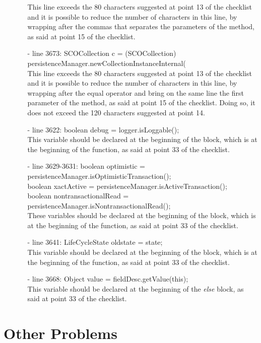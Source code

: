 \documentclass[18pt,oneside,a4paper, titlepage]{article}
\begin{document}
\begin{itemize}
\begin{itemize}
			This line exceeds the 80 characters suggested at point 13 of the checklist and it is possible to reduce the number of characters in this line, by wrapping after the commas that separates the parameters of the method, as said at point 15 of the checklist.
			\item[-] line 3673: SCOCollection c = (SCOCollection) persistenceManager.newCollectionInstanceInternal(\\
			This line exceeds the 80 characters suggested at point 13 of the checklist and it is possible to reduce the number of characters in this line, by wrapping after the equal operator and bring on the same line the first parameter of the method, as said at point 15 of the checklist. Doing so, it does not exceed the 120 characters suggested at point 14.
			\item[-] line 3622: boolean debug = logger.isLoggable();\\
			This variable should be declared at the beginning of the block, which is at the beginning of the function, as said at point 33 of the checklist.
			\item[-] line 3629-3631: boolean optimistic = persistenceManager.isOptimisticTransaction();\\
			boolean xactActive = persistenceManager.isActiveTransaction();\\
			boolean nontransactionalRead = persistenceManager.isNontransactionalRead();\\
			These variables should be declared at the beginning of the block, which is at the beginning of the function, as said at point 33 of the checklist.
			\item[-] line 3641: LifeCycleState oldstate = state;\\
			This variable should be declared at the beginning of the block, which is at the beginning of the function, as said at point 33 of the checklist.
			\item[-] line 3668: Object value = fieldDesc.getValue(this);\\
			This variable should be declared at the beginning of the \textit{else} block, as said at point 33 of the checklist.
		\end{itemize}
		
	\end{itemize}

\newpage
\section{Other Problems}
\end{document}
